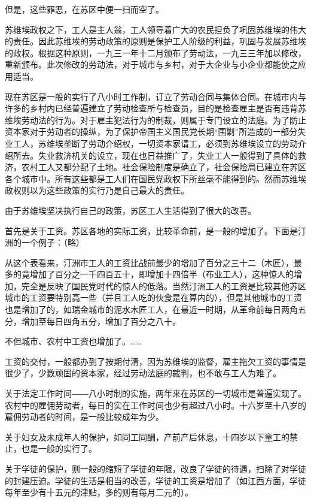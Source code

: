 但是，这些罪恶，在苏区中便一扫而空了。

苏维埃政权之下，工人是主人翁，工人领导着广大的农民担负了巩固苏维埃的伟大的责任。因此苏维埃的劳动政策的原则是保护工人阶级的利益，巩固与发展苏维埃的政权。根据这种原则，一九三一年十二月颁布了劳动法，一九三三年加以修改，重新颁布。此次修改的劳动法，对于城市与乡村，对于大企业与小企业都能使之应用适当。

现在苏区是一般的实行了八小时工作制，订立了劳动合同与集体合同。在城市内与许多的乡村内已经普遍建立了劳动检查所与检查员，目的是检查雇主是否有违背苏维埃劳动法的行为。对于雇主犯法行为的制裁，则属于专门设立的法庭。为了防止资本家对于劳动者的操纵，为了保护帝国主义国民党长期“围剿”所造成的一部分失业工人，苏维埃垄断了劳动介绍权，一切资本家请工，必须到苏维埃设立的劳动介绍所去。失业救济机关的设立，现在也日益推广了，失业工人一般得到了具体的救济，农村工人又都分配了土地。社会保险制度是确立了，社会保险局已建立在苏区各个城市中。所有这些都是工人们在国民党政权下所丝毫不能得到的。然而苏维埃政权则以为这些政策的实行乃是自己最大的责任。

由于苏维埃坚决执行自己的政策，苏区工人生活得到了很大的改善。

首先是关于工资。苏区各地的实际工资，比较革命前，是一般的增加了。下面是汀洲的一个例子：（略）

从这个表看来，汀洲市工人的工资比战前最少的增加了百分之三十二（木匠），最多的竟增加了百分之一千四百五十，即增加十四倍半（布业工人），这种惊人的增加，完全是反映了国民党时代的惊人的低落。当然汀洲工人的工资是比较其他苏区城市的工资要特别高一些（并且工人吃的伙食是在算内的），但是其他城市的工资也是增加了的，如瑞金城市的泥水木匠工人，在最近一时期，从革命前每日两角五分，增加至每日四角五分，增加了百分之八十。

不但城市、农村中工资也增加了。……

工资的交付，一般都办到了按期付清，因为苏维埃的监督，雇主拖欠工资的事情是很少了，少数顽固的资本家，经过劳动法庭的裁判，也不敢与工人为难了。

关于法定工作时间――八小时制的实施，两年来在苏区的一切城市是普遍实现了。农村中的雇佣劳动者，每日的实在工作时间也少有超过八小时。十六岁至十八岁的雇佣劳动者的时间，是一般比较成年为少。

关于妇女及未成年人的保护，如同工同酬，产前产后休息，十四岁以下童工的禁止，也是一般的实行了。

关于学徒的保护，则一般的缩短了学徒的年限，改良了学徒的待遇，扫除了对学徒的封建压迫。学徒的生活是相当的改善，学徒的工资是增加了（如江西方面，学徒每年至少有十五元的津贴，多的则有每月二元的）。

